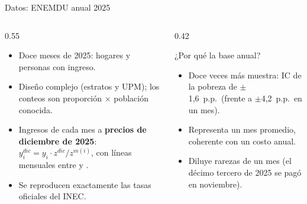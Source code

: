 \documentclass[aspectratio=169,11pt]{beamer}
\newcommand{\usd}[1]{\text{USD~#1}}
\begin{document}
\begin{frame}{Datos: ENEMDU anual 2025}
  \begin{columns}[T]
    \begin{column}{0.55\textwidth}
      \begin{itemize}\small
        \item Doce meses de 2025: \cNHog{} hogares y \cNPer{} personas con ingreso.
        \item Diseño complejo (estratos y UPM); los conteos son proporción $\times$ población conocida.
        \item Ingresos de cada mes a \textbf{precios de diciembre de 2025}:
          $y_i^{dic} = y_i \cdot z^{dic}/z^{m(i)}$, con líneas mensuales entre \usd{\cLineaMin} y \usd{\cLineaMax}.
        \item Se reproducen exactamente las tasas oficiales del INEC.
      \end{itemize}
    \end{column}
    \begin{column}{0.42\textwidth}
      \begin{block}{¿Por qué la base anual?}\small
        \begin{itemize}
          \item Doce veces más muestra: IC de la pobreza de $\pm$1,6~p.p.\ (frente a $\pm$4,2~p.p.\ en un mes).
          \item Representa un mes promedio, coherente con un costo anual.
          \item Diluye rarezas de un mes (el décimo tercero de 2025 se pagó en noviembre).
        \end{itemize}
      \end{block}
    \end{column}
  \end{columns}
\end{frame}
\end{document}
